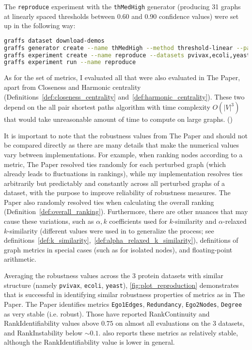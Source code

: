 The \texttt{reproduce} experiment with the \texttt{thMedHigh} generator (producing 31 graphs at linearly spaced thresholds between 0.60 and 0.90 confidence values) were set up in the following way:
\begin{lstlisting}[language=bash]
graffs dataset download-demos
graffs generator create --name thMedHigh --method threshold-linear --params 600,900 -n 31 --seed 7
graffs experiment create --name reproduce --datasets pvivax,ecoli,yeast --generator thMedHigh --metrics Betweenness,Degree,Ego1Edges,Ego2Nodes,LocalClustering,PageRank,Redundancy --robustnessMeasures RankIdentifiability,RankInstability,RankContinuity
graffs experiment run --name reproduce
\end{lstlisting}

As for the set of metrics, I evaluated all that were also evaluated in The Paper, apart from Closeness and Harmonic centrality (Definitions~\ref{def:closeness_centrality} and~\ref{def:harmonic_centrality}).
These two depend on the all pair shortest paths algorithm with time complexity $O({\left\lvert V \right\rvert}^3)$ that would take unreasonable amount of time to compute on large graphs. ()

It is important to note that the robustness values from The Paper and \graffs should not be compared directly as there are many details that make the numerical values vary between implementations.
For example, when ranking nodes according to a metric, The Paper resolved ties randomly for each perturbed graph (which already leads to fluctuations in rankings), while my implementation resolves ties arbitrarily but predictably and constantly across all perturbed graphs of a dataset, with the purpose to improve reliability of robustness measures.
The Paper also randomly resolved ties when calculating the overall ranking (Definition~\ref{def:overall_ranking}).
Furthermore, there are other nuances that may cause these variations, such as $\alpha,k$ coefficients used for $k$-similarity and $\alpha$-relaxed $k$-similarity (different values were used in \graffs to generalize the process; see definitions~\ref{def:k_similarity},~\ref{def:alpha_relaxed_k_similarity}), definitions of graph metrics in special cases (such as for isolated nodes), and floating-point arithmetic.



Averaging the robustness values across the 3 protein datasets with similar structure (namely \texttt{pvivax}, \texttt{ecoli}, \texttt{yeast}), \autoref{fig:plot_reproduction} demonstrates that \graffs is successful in identifying similar robustness properties of metrics as in The Paper.
The Paper identifies metrics \texttt{Ego1Edges}, \texttt{Redundancy}, \texttt{Ego2Nodes}, \texttt{Degree} as very stable (i.e. robust).
Those have reported RankContinuity and RankIdentifiability values above $0.75$ on almost all evaluations on the 3 datasets, and RankInstability below $\sim 0.1$.
\graffs also reports these metrics as relatively stable, although the RankIdentifiability value is lower in general.

